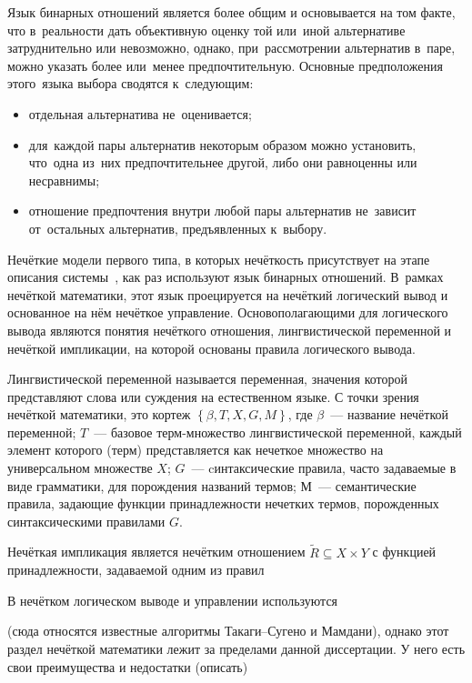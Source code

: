 Язык бинарных отношений является более общим и основывается на том факте, что в~реальности дать объективную оценку той или~иной альтернативе затруднительно или невозможно, однако, при~рассмотрении альтернатив в~паре, можно указать более или~менее предпочтительную. Основные предположения этого~языка выбора сводятся к~следующим:
\begin{itemize}
	\item отдельная альтернатива не~оценивается;
	\item для~каждой пары альтернатив некоторым образом можно установить, что~одна из~них предпочтительнее другой, либо они равноценны или несравнимы;
	\item отношение предпочтения внутри любой пары альтернатив не~зависит от~остальных альтернатив, предъявленных к~выбору.
\end{itemize}

Нечёткие модели первого типа, в которых нечёткость присутствует на этапе описания системы~\cite{Choice_Languages}, как раз используют язык бинарных отношений. В~рамках нечёткой математики, этот язык проецируется на нечёткий логический вывод и основанное на нём нечёткое управление. Основополагающими для логического вывода являются понятия нечёткого отношения, лингвистической переменной и нечёткой импликации, на которой основаны правила логического вывода.

\begin{mydef}
Лингвистической переменной называется переменная, значения которой представляют слова или суждения на естественном языке. С точки зрения нечёткой математики, это кортеж $\left\lbrace \beta, T, X, G, M \right\rbrace$, где $\beta$~--- название нечёткой переменной; $T$~--- базовое терм-множество лингвистической переменной, каждый элемент которого (терм) представляется как нечеткое множество на универсальном множестве $X$; $G$~--- cинтаксические правила, часто задаваемые в виде грамматики, для порождения названий термов; $М$~--- семантические правила, задающие функции принадлежности нечетких термов, порожденных синтаксическими правилами $G$.
\end{mydef}

Нечёткая импликация является нечётким отношением $\tilde R \subseteq X \times Y$ с функцией принадлежности, задаваемой одним из правил

В нечётком логическом выводе и управлении используются 

 (сюда относятся известные алгоритмы Такаги--Сугено и Мамдани), однако этот раздел нечёткой математики лежит за пределами данной диссертации. У него есть свои преимущества и недостатки (описать)
 
